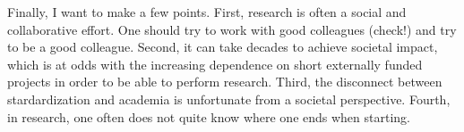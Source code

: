 \documentclass[11pt]{article}
\begin{document}
Finally, I want to make a few points. First, research is often a social and collaborative effort. One should try to work with good colleagues (check!) and try to be a good colleague. Second, it can take decades to achieve societal impact, which is at odds with the increasing dependence on short externally funded projects in order to be able to perform research. Third, the disconnect between stardardization and academia is unfortunate from a societal perspective. Fourth, in research, one often does not quite know where one ends when starting.

\end{document}

